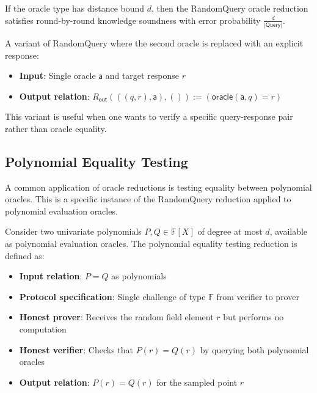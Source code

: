 \begin{theorem}
    If the oracle type has distance bound $d$, then the RandomQuery oracle reduction satisfies round-by-round knowledge soundness with error probability $\frac{d}{|\mathsf{Query}|}$.
\end{theorem}

\begin{definition}
    \label{def:randomquery_with_response}
    A variant of RandomQuery where the second oracle is replaced with an explicit response:
    \begin{itemize}
        \item \textbf{Input}: Single oracle $\mathsf{a}$ and target response $r$
        \item \textbf{Output relation}: $R_{\mathsf{out}}(((q, r), \mathsf{a}), ()) := (\mathsf{oracle}(\mathsf{a}, q) = r)$
    \end{itemize}
    This variant is useful when one wants to verify a specific query-response pair rather than oracle equality.
\end{definition}

\subsection{Polynomial Equality Testing}

A common application of oracle reductions is testing equality between polynomial oracles. This is a specific instance of the RandomQuery reduction applied to polynomial evaluation oracles.

\begin{definition}
    \label{def:polynomial_equality_testing}
    Consider two univariate polynomials $P, Q \in \mathbb{F}[X]$ of degree at most $d$, available as polynomial evaluation oracles. The polynomial equality testing reduction is defined as:
    \begin{itemize}
        \item \textbf{Input relation}: $P = Q$ as polynomials
        \item \textbf{Protocol specification}: Single challenge of type $\mathbb{F}$ from verifier to prover
        \item \textbf{Honest prover}: Receives the random field element $r$ but performs no computation
        \item \textbf{Honest verifier}: Checks that $P(r) = Q(r)$ by querying both polynomial oracles
        \item \textbf{Output relation}: $P(r) = Q(r)$ for the sampled point $r$
    \end{itemize}
\end{definition}

